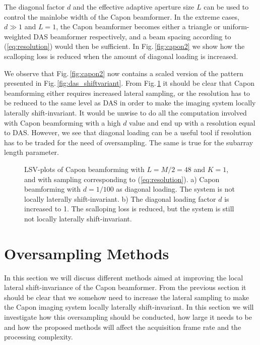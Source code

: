 \documentclass[draftcls]{IEEEtran}
\newcommand{\img}{img/}
\begin{document}
The diagonal factor $d$ and the effective adaptive aperture size $L$ can be used to control the mainlobe width of the Capon beamformer. In the extreme cases, $d\gg1$ and $L=1$, the Capon beamformer becomes either a triangle or uniform-weighted DAS beamformer respectively, and a beam spacing according to (\ref{eq:resolution}) would then be sufficient. In Fig.\,\ref{fig:capon2} we show how the scalloping loss is reduced when the amount of diagonal loading is increased. 

We observe that Fig.\,\ref{fig:capon2} now contains a scaled version of the pattern presented in Fig.\,\ref{fig:das_shiftvariant}. From Fig.\,\ref{fig:capon} it should be clear that Capon beamforming either requires increased lateral sampling, or the resolution has to be reduced to the same level as DAS in order to make the imaging system locally laterally shift-invariant. It would be unwise to do all the computation involved with Capon beamforming with a high $d$ value and end up with a resolution equal to DAS. However, we see that diagonal loading can be a useful tool if resolution has to be traded for the need of oversampling. The same is true for the subarray length parameter.

\begin{figure}[!t]
\centerline{
}
\caption{LSV-plots of Capon beamforming with $L=M/2=48$ and $K=1$, and with sampling corresponding to (\ref{eq:resolution}). a) Capon beamforming with $d=1/100$ as diagonal loading. The system is not locally laterally shift-invariant. b) The diagonal loading factor $d$ is increased to 1. The scalloping loss is reduced, but the system is still not locally laterally shift-invariant.}
\label{fig:capon}
\end{figure}

\section{Oversampling Methods}\label{sec:methods}
In this section we will discuss different methods aimed at improving the local lateral shift-invariance of the Capon beamformer. From the previous section it should be clear that we somehow need to increase the lateral sampling to make the Capon imaging system locally laterally shift-invariant. In this section we will investigate how this oversampling should be conducted, how large it needs to be and how the proposed methods will affect the acquisition frame rate and the processing complexity.
\end{document}
